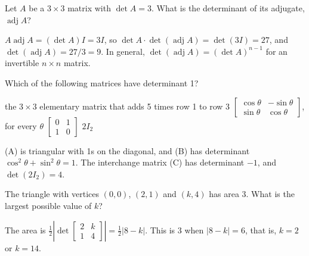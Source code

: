 \begin{question}[id=det-18, marks=2]
Let $A$ be a $3 \times 3$ matrix with $\det A = 3$. What is the determinant of its adjugate, $\operatorname{adj} A$?
\begin{solution}
$A \operatorname{adj} A = (\det A) I = 3I$, so $\det A \cdot \det(\operatorname{adj} A) = \det(3I) = 27$, and $\det(\operatorname{adj} A) = 27/3 = 9$. In general, $\det(\operatorname{adj} A) = (\det A)^{n-1}$ for an invertible $n \times n$ matrix.
\end{solution}
\end{question}

\begin{question}[id=det-19, type=msq, marks=2]
Which of the following matrices have determinant 1?
\begin{options}
  \correct the $3 \times 3$ elementary matrix that adds 5 times row 1 to row 3
  \correct $\begin{bmatrix} \cos\theta & -\sin\theta \\ \sin\theta & \cos\theta \end{bmatrix}$, for every $\theta$
  \option $\begin{bmatrix} 0 & 1 \\ 1 & 0 \end{bmatrix}$
  \option $2I_2$
\end{options}
\begin{solution}
(A) is triangular with 1s on the diagonal, and (B) has determinant $\cos^2\theta + \sin^2\theta = 1$. The interchange matrix (C) has determinant $-1$, and $\det(2I_2) = 4$.
\end{solution}
\end{question}

\begin{question}[id=det-20, marks=2]
The triangle with vertices $(0, 0)$, $(2, 1)$ and $(k, 4)$ has area 3. What is the largest possible value of $k$?
\begin{solution}
The area is $\frac{1}{2}\left|\det\begin{bmatrix} 2 & k \\ 1 & 4 \end{bmatrix}\right| = \frac{1}{2}|8 - k|$. This is 3 when $|8 - k| = 6$, that is, $k = 2$ or $k = 14$.
\end{solution}
\end{question}


